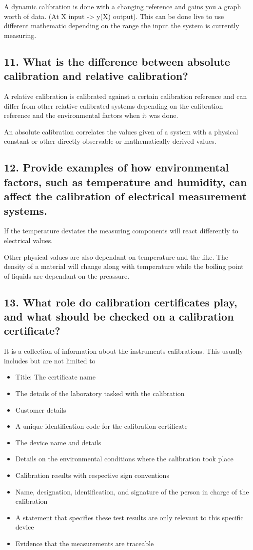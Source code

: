 A dynamic calibration is done with a changing reference and gains you a graph worth of data. (At X input -> y(X) output).
This can be done live to use different mathematic depending on the range the input the system is currently measuring.

\subsection{\textbf{11. What is the difference between absolute calibration and relative calibration?}}
A relative calibration is calibrated against a certain calibration reference and can differ from other relative calibrated systems depending on the calibration reference and the environmental factors when it was done.

An absolute calibration correlates the values given of a system with a physical constant or other directly observable or mathematically derived values.


\subsection{\textbf{12. Provide examples of how environmental factors, such as temperature and humidity, can affect the calibration of electrical measurement systems.}}

If the temperature deviates the measuring components will react differently to electrical values. 

Other physical values are also dependant on temperature and the like. The density of a material will change along with temperature while the boiling point of liquids are dependant on the preassure.


\subsection{\textbf{13. What role do calibration certificates play, and what should be checked on a calibration certificate?}}
It is a collection of information about the instruments calibrations. This usually includes but are not limited to 
\begin{itemize}
    \item Title: The certificate name
    \item The details of the laboratory tasked with the calibration
    \item Customer details
    \item A unique identification code for the calibration certificate
    \item The device name and details
    \item Details on the environmental conditions where the calibration took place
    \item Calibration results with respective sign conventions
    \item Name, designation, identification, and signature of the person in charge of the calibration
    \item A statement that specifies these test results are only relevant to this specific device
    \item Evidence that the measurements are traceable
\end{itemize}

